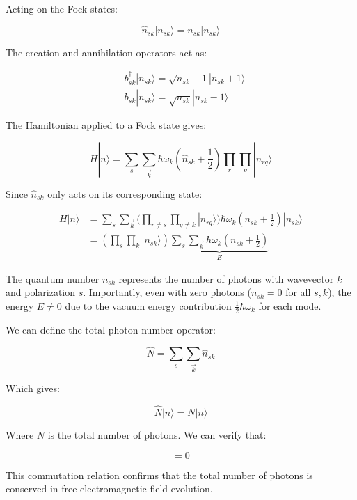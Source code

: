 \documentclass[italian]{HKNdocument}
\begin{document}
Acting on the Fock states:

\begin{equation}
\hat{n}_{sk}|n_{sk}\rangle=n_{sk}|n_{sk}\rangle
\end{equation}

The creation and annihilation operators act as:

\begin{align}
&b_{sk}^\dagger|n_{sk}\rangle=\sqrt{n_{sk}+1}|n_{sk}+1\rangle \\
&b_{sk}|n_{sk}\rangle=\sqrt{n_{sk}}|n_{sk}-1\rangle
\end{align}

The Hamiltonian applied to a Fock state gives:

\begin{equation}
H|n\rangle=\sum_s\sum_{\vec{k}}\hbar\omega_k(\hat{n}_{sk}+\frac{1}{2})\prod_r\prod_q|n_{rq}\rangle
\end{equation}

Since $\hat{n}_{sk}$ only acts on its corresponding state:

\begin{align}
H|n\rangle&=\sum_s\sum_{\vec{k}}(\prod_{r\neq s}\prod_{q\neq k}|n_{rq}\rangle)\hbar\omega_k(n_{sk}+\frac{1}{2})|n_{sk}\rangle\\
&=(\prod_s\prod_k|n_{sk}\rangle)\underbrace{\sum_s\sum_{\vec{k}}\hbar\omega_k(n_{sk}+\frac{1}{2})}_E
\end{align}

The quantum number $n_{sk}$ represents the number of photons with wavevector $k$ and polarization $s$. Importantly, even with zero photons ($n_{sk}=0$ for all $s,k$), the energy $E\neq 0$ due to the vacuum energy contribution $\frac{1}{2}\hbar\omega_k$ for each mode.

We can define the total photon number operator:

\begin{equation}
\hat{N}=\sum_s\sum_{\vec{k}}\hat{n}_{sk}
\end{equation}

Which gives:

\begin{equation}
\hat{N}|n\rangle=N|n\rangle
\end{equation}

Where $N$ is the total number of photons. We can verify that:

\begin{equation}
[\hat{N},H]=0
\end{equation}

This commutation relation confirms that the total number of photons is conserved in free electromagnetic field evolution.
\end{document}
